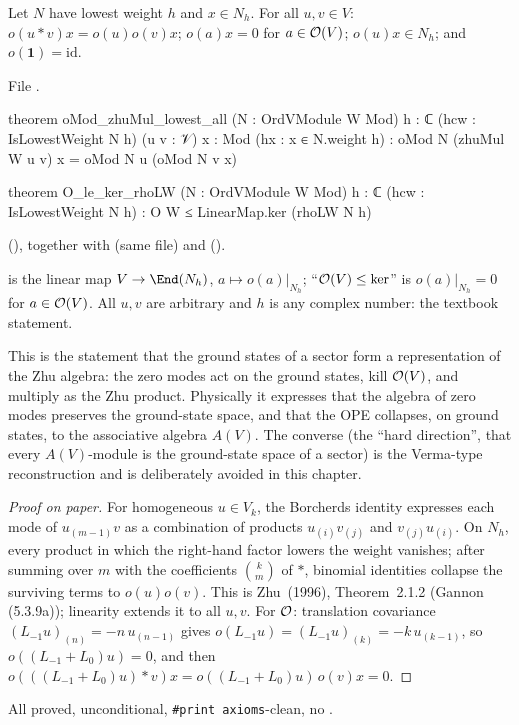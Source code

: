\begin{theorem}\label{ch12:thm:easy}
Let $N$ have lowest weight $h$ and $x\in N_h$.  For all $u,v\in V$: $o(u\ast v)x=o(u)o(v)x$;
$o(a)x=0$ for $a\in\mathcal{O}(V)$; $o(u)x\in N_h$; and $o(\mathbf 1)=\mathrm{id}$.
\end{theorem}
File .
\begin{leancode}
theorem oMod_zhuMul_lowest_all (N : OrdVModule W Mod) {h : ℂ} (hcw : IsLowestWeight N h)
    (u v : 𝒱) {x : Mod} (hx : x ∈ N.weight h) :
    oMod N (zhuMul W u v) x = oMod N u (oMod N v x)

theorem O_le_ker_rhoLW (N : OrdVModule W Mod) {h : ℂ} (hcw : IsLowestWeight N h) :
    O W ≤ LinearMap.ker (rhoLW N h)
\end{leancode}
(), together with  (same file)
and  ().
\begin{dictionary}
 is the linear map $V\to\End(N_h)$, $a\mapsto o(a)|_{N_h}$; ``$\mathcal{O}(V)\le\ker$'' is
$o(a)|_{N_h}=0$ for $a\in\mathcal{O}(V)$.  All $u,v$ are arbitrary and $h$ is any complex number: the
textbook statement.
\end{dictionary}

\begin{physics}
This is the statement that the ground states of a sector form a representation of the Zhu algebra: the zero modes act on the ground states, kill $\mathcal{O}(V)$, and multiply as the Zhu product. Physically it expresses that the algebra of zero modes preserves the ground-state space, and that the OPE collapses, on ground states, to the associative algebra $A(V)$. The converse (the ``hard direction'', that every $A(V)$-module is the ground-state space of a sector) is the Verma-type reconstruction and is deliberately avoided in this chapter.
\end{physics}
\begin{proof}[Proof on paper]
For homogeneous $u\in V_k$, the Borcherds identity expresses each mode of $u_{(m-1)}v$ as a combination
of products $u_{(i)}v_{(j)}$ and $v_{(j)}u_{(i)}$.  On $N_h$, every product in which the right-hand
factor lowers the weight vanishes; after summing over $m$ with the coefficients $\binom km$ of $\ast$,
binomial identities collapse the surviving terms to $o(u)o(v)$.  This is Zhu~(1996), Theorem~2.1.2
(Gannon (5.3.9a)); linearity extends it to all $u,v$.  For $\mathcal{O}$: translation covariance
$(L_{-1}u)_{(n)}=-n\,u_{(n-1)}$ gives $o(L_{-1}u)=(L_{-1}u)_{(k)}=-k\,u_{(k-1)}$, so
$o((L_{-1}+L_0)u)=0$, and then $o(((L_{-1}+L_0)u)\ast v)x=o((L_{-1}+L_0)u)\,o(v)x=0$.
\end{proof}
\begin{status}All proved, unconditional, \texttt{\#print axioms}-clean, no .\end{status}

